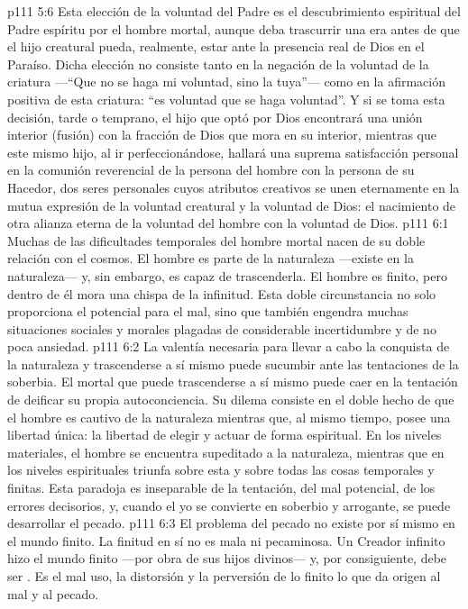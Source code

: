 \vs p111 5:6 Esta elección de la voluntad del Padre es el descubrimiento espiritual del Padre espíritu por el hombre mortal, aunque deba trascurrir una era antes de que el hijo creatural pueda, realmente, estar ante la presencia real de Dios en el Paraíso. Dicha elección no consiste tanto en la negación de la voluntad de la criatura ---“Que no se haga mi voluntad, sino la tuya”--- como en la afirmación positiva de esta criatura: “es  voluntad que se haga  voluntad”. Y si se toma esta decisión, tarde o temprano, el hijo que optó por Dios encontrará una unión interior (fusión) con la fracción de Dios que mora en su interior, mientras que este mismo hijo, al ir perfeccionándose, hallará una suprema satisfacción personal en la comunión reverencial de la persona del hombre con la persona de su Hacedor, dos seres personales cuyos atributos creativos se unen eternamente en la mutua expresión de la voluntad creatural y la voluntad de Dios: el nacimiento de otra alianza eterna de la voluntad del hombre con la voluntad de Dios.
\vs p111 6:1 Muchas de las dificultades temporales del hombre mortal nacen de su doble relación con el cosmos. El hombre es parte de la naturaleza ---existe en la naturaleza--- y, sin embargo, es capaz de trascenderla. El hombre es finito, pero dentro de él mora una chispa de la infinitud. Esta doble circunstancia no solo proporciona el potencial para el mal, sino que también engendra muchas situaciones sociales y morales plagadas de considerable incertidumbre y de no poca ansiedad.
\vs p111 6:2 La valentía necesaria para llevar a cabo la conquista de la naturaleza y trascenderse a sí mismo puede sucumbir ante las tentaciones de la soberbia. El mortal que puede trascenderse a sí mismo puede caer en la tentación de deificar su propia autoconciencia. Su dilema consiste en el doble hecho de que el hombre es cautivo de la naturaleza mientras que, al mismo tiempo, posee una libertad única: la libertad de elegir y actuar de forma espiritual. En los niveles materiales, el hombre se encuentra supeditado a la naturaleza, mientras que en los niveles espirituales triunfa sobre esta y sobre todas las cosas temporales y finitas. Esta paradoja es inseparable de la tentación, del mal potencial, de los errores decisorios, y, cuando el yo se convierte en soberbio y arrogante, se puede desarrollar el pecado.
\vs p111 6:3 \pc El problema del pecado no existe por sí mismo en el mundo finito. La finitud en sí no es mala ni pecaminosa. Un Creador infinito hizo el mundo finito ---por obra de sus hijos divinos--- y, por consiguiente, debe ser . Es el mal uso, la distorsión y la perversión de lo finito lo que da origen al mal y al pecado.
